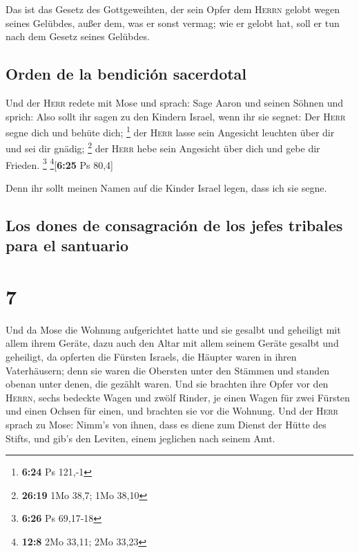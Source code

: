  Das ist das Gesetz des Gottgeweihten, der sein Opfer dem
\textsc{Herrn} gelobt wegen seines Gelübdes, außer dem, was er sonst
vermag; wie er gelobt hat, soll er tun nach dem Gesetz seines Gelübdes.

\hypertarget{orden-de-la-bendiciuxf3n-sacerdotal}{%
\subsection{Orden de la bendición
sacerdotal}\label{orden-de-la-bendiciuxf3n-sacerdotal}}

 Und der \textsc{Herr} redete mit Mose und sprach:
 Sage Aaron und seinen Söhnen und sprich: Also sollt ihr
sagen zu den Kindern Israel, wenn ihr sie segnet:  Der
\textsc{Herr} segne dich und behüte dich; \footnote{\textbf{6:24} Ps
  121,-1}  der \textsc{Herr} lasse sein Angesicht
leuchten über dir und sei dir gnädig; \footnote{\textbf{26:19} 1Mo 38,7;
  1Mo 38,10}  der \textsc{Herr} hebe sein Angesicht über
dich und gebe dir Frieden. \footnote{\textbf{6:26} Ps 69,17-18}
\footnote{\textbf{12:8} 2Mo 33,11; 2Mo 33,23}{[}\textbf{6:25} Ps 80,4{]}

 Denn ihr sollt meinen Namen auf die Kinder Israel legen,
dass ich sie segne.

\hypertarget{los-dones-de-consagraciuxf3n-de-los-jefes-tribales-para-el-santuario}{%
\subsection{Los dones de consagración de los jefes tribales para el
santuario}\label{los-dones-de-consagraciuxf3n-de-los-jefes-tribales-para-el-santuario}}

\hypertarget{section-6}{%
\section{7}\label{section-6}}

 Und da Mose die Wohnung aufgerichtet hatte und sie
gesalbt und geheiligt mit allem ihrem Geräte, dazu auch den Altar mit
allem seinem Geräte gesalbt und geheiligt,  da opferten
die Fürsten Israels, die Häupter waren in ihren Vaterhäusern; denn sie
waren die Obersten unter den Stämmen und standen obenan unter denen, die
gezählt waren.  Und sie brachten ihre Opfer vor den
\textsc{Herrn}, sechs bedeckte Wagen und zwölf Rinder, je einen Wagen
für zwei Fürsten und einen Ochsen für einen, und brachten sie vor die
Wohnung.  Und der \textsc{Herr} sprach zu Mose:
 Nimm's von ihnen, dass es diene zum Dienst der Hütte des
Stifts, und gib's den Leviten, einem jeglichen nach seinem Amt.

